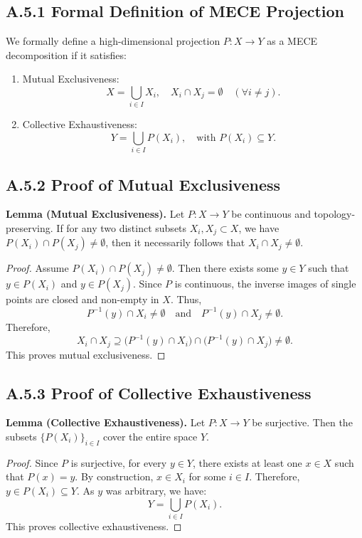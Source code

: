 \documentclass[11pt]{article}
\begin{document}
\subsection*{A.5.1 Formal Definition of MECE Projection}
We formally define a high-dimensional projection \( P: X \rightarrow Y \) as a MECE decomposition if it satisfies:
\begin{enumerate}[label=(\roman*)]
    \item Mutual Exclusiveness:
    \[
        X = \bigcup_{i \in I} X_i, \quad X_i \cap X_j = \emptyset \quad (\forall i \neq j).
    \]
    \item Collective Exhaustiveness:
    \[
        Y = \bigcup_{i \in I} P(X_i), \quad \text{with } P(X_i) \subseteq Y.
    \]
\end{enumerate}

\subsection*{A.5.2 Proof of Mutual Exclusiveness}
\textbf{Lemma (Mutual Exclusiveness).}  
Let \( P: X \rightarrow Y \) be continuous and topology-preserving. If for any two distinct subsets \( X_i, X_j \subset X \), we have \( P(X_i) \cap P(X_j) \neq \emptyset \), then it necessarily follows that \( X_i \cap X_j \neq \emptyset \).

\begin{proof}
Assume \( P(X_i) \cap P(X_j) \neq \emptyset \). Then there exists some \( y \in Y \) such that \( y \in P(X_i) \) and \( y \in P(X_j) \). Since \( P \) is continuous, the inverse images of single points are closed and non-empty in \( X \). Thus,
\[
P^{-1}(y) \cap X_i \neq \emptyset \quad \text{and} \quad P^{-1}(y) \cap X_j \neq \emptyset.
\]
Therefore, 
\[
X_i \cap X_j \supseteq \bigl(P^{-1}(y) \cap X_i\bigr) \cap \bigl(P^{-1}(y) \cap X_j\bigr) \neq \emptyset.
\]
This proves mutual exclusiveness.
\end{proof}

\subsection*{A.5.3 Proof of Collective Exhaustiveness}
\textbf{Lemma (Collective Exhaustiveness).}  
Let \( P: X \rightarrow Y \) be surjective. Then the subsets \( \{P(X_i)\}_{i \in I} \) cover the entire space \( Y \).

\begin{proof}
Since \( P \) is surjective, for every \( y \in Y \), there exists at least one \( x \in X \) such that \( P(x) = y \). By construction, \( x \in X_i \) for some \( i \in I \). Therefore, \( y \in P(X_i) \subseteq Y \). As \( y \) was arbitrary, we have:
\[
Y = \bigcup_{i \in I} P(X_i).
\]
This proves collective exhaustiveness.
\end{proof}
\end{document}
